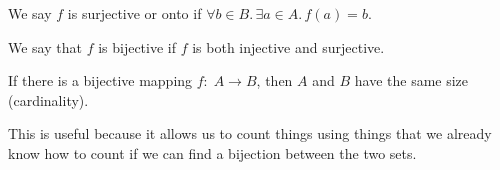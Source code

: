 \begin{definition}[Surjective]
   We say $f$ is surjective or onto if $\forall b \in B.\, \exists a \in A.\, f(a) = b$.
\end{definition}

\begin{definition}[Bijection]
   We say that $f$ is bijective if $f$ is both injective and surjective.
\end{definition}

\begin{remark}
   If there is a bijective mapping $f:\; A \to B$, then $A$ and $B$ have the same size (cardinality).
\end{remark}

This is useful because it allows us to count things using things that we already know how to count if we can find a bijection between the two sets.